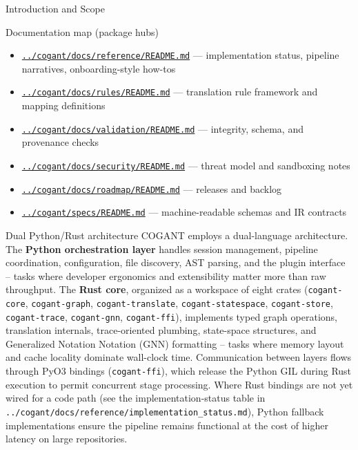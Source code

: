 \documentclass[
  ignorenonframetext,
]{beamer}
\providecommand{\tightlist}{%
  \setlength{\itemsep}{0pt}\setlength{\parskip}{0pt}}
\begin{document}
\begin{frame}[fragile]{Introduction and Scope}
\begin{block}{Documentation map (package hubs)}
\begin{itemize}
\tightlist
\item
  \href{../cogant/docs/reference/README.md}{\texttt{../cogant/docs/reference/README.md}}
  --- implementation status, pipeline narratives, onboarding-style
  how-tos
\item
  \href{../cogant/docs/rules/README.md}{\texttt{../cogant/docs/rules/README.md}}
  --- translation rule framework and mapping definitions
\item
  \href{../cogant/docs/validation/README.md}{\texttt{../cogant/docs/validation/README.md}}
  --- integrity, schema, and provenance checks
\item
  \href{../cogant/docs/security/README.md}{\texttt{../cogant/docs/security/README.md}}
  --- threat model and sandboxing notes
\item
  \href{../cogant/docs/roadmap/README.md}{\texttt{../cogant/docs/roadmap/README.md}}
  --- releases and backlog
\item
  \href{../cogant/specs/README.md}{\texttt{../cogant/specs/README.md}}
  --- machine-readable schemas and IR contracts
\end{itemize}
\end{block}

\begin{block}{Dual Python/Rust architecture}
\protect{}\label{dual-pythonrust-architecture}
COGANT employs a dual-language architecture. The \textbf{Python
orchestration layer} handles session management, pipeline coordination,
configuration, file discovery, AST parsing, and the plugin interface --
tasks where developer ergonomics and extensibility matter more than raw
throughput. The \textbf{Rust core}, organized as a workspace of eight
crates (\texttt{cogant-core}, \texttt{cogant-graph},
\texttt{cogant-translate}, \texttt{cogant-statespace},
\texttt{cogant-store}, \texttt{cogant-trace}, \texttt{cogant-gnn},
\texttt{cogant-ffi}), implements typed graph operations, translation
internals, trace-oriented plumbing, state-space structures, and
Generalized Notation Notation (GNN) formatting -- tasks where memory
layout and cache locality dominate wall-clock time. Communication
between layers flows through PyO3 bindings (\texttt{cogant-ffi}), which
release the Python GIL during Rust execution to permit concurrent stage
processing. Where Rust bindings are not yet wired for a code path (see
the implementation-status table in
\texttt{../cogant/docs/reference/implementation\_status.md}), Python
fallback implementations ensure the pipeline remains functional at the
cost of higher latency on large repositories.
\end{block}


\end{frame}
\end{document}
